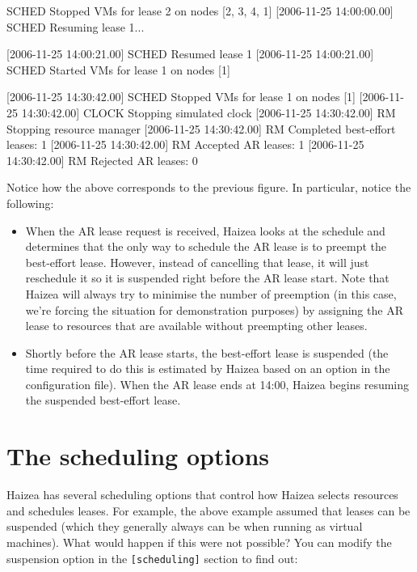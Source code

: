\begin{wideshellverbatim}
[2006-11-25 14:00:00.00] SCHED   Stopped VMs for lease 2 on nodes [2, 3, 4, 1]
[2006-11-25 14:00:00.00] SCHED   Resuming lease 1...

[2006-11-25 14:00:21.00] SCHED   Resumed lease 1
[2006-11-25 14:00:21.00] SCHED   Started VMs for lease 1 on nodes [1]

[2006-11-25 14:30:42.00] SCHED   Stopped VMs for lease 1 on nodes [1]
[2006-11-25 14:30:42.00] CLOCK   Stopping simulated clock
[2006-11-25 14:30:42.00] RM      Stopping resource manager
[2006-11-25 14:30:42.00] RM        Completed best-effort leases: 1
[2006-11-25 14:30:42.00] RM        Accepted AR leases: 1
[2006-11-25 14:30:42.00] RM        Rejected AR leases: 0
\end{wideshellverbatim}

Notice how the above corresponds to the previous figure. In particular, notice the following:

\begin{itemize}
 \item  When the AR lease request is received, Haizea looks at the schedule and determines that the only way to schedule the AR lease is to preempt the best-effort lease. However, instead of cancelling that lease, it will just reschedule it so it is suspended right before the AR lease start. Note that Haizea will always try to minimise the number of preemption (in this case, we're forcing the situation for demonstration purposes) by assigning the AR lease to resources that are available without preempting other leases.
 \item Shortly before the AR lease starts, the best-effort lease is suspended (the time required to do this is estimated by Haizea based on an option in the configuration file). When the AR lease ends at 14:00, Haizea begins resuming the suspended best-effort lease.
\end{itemize}

\section{The scheduling options}

Haizea has several scheduling options that control how Haizea selects resources and schedules leases. For example, the above example assumed that leases can be suspended (which they generally always can be when running as virtual machines). What would happen if this were not possible? You can modify the suspension option in the \texttt{[scheduling]} section to find out:


